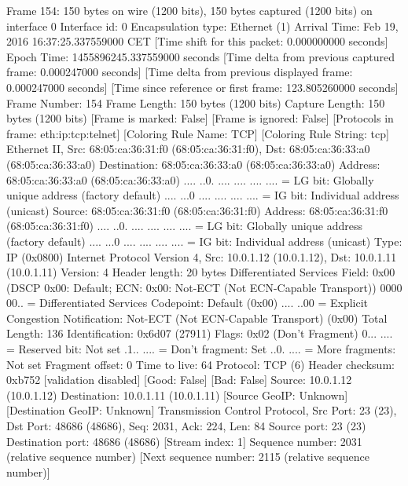 Frame 154: 150 bytes on wire (1200 bits), 150 bytes captured (1200 bits) on interface 0
    Interface id: 0
    Encapsulation type: Ethernet (1)
    Arrival Time: Feb 19, 2016 16:37:25.337559000 CET
    [Time shift for this packet: 0.000000000 seconds]
    Epoch Time: 1455896245.337559000 seconds
    [Time delta from previous captured frame: 0.000247000 seconds]
    [Time delta from previous displayed frame: 0.000247000 seconds]
    [Time since reference or first frame: 123.805260000 seconds]
    Frame Number: 154
    Frame Length: 150 bytes (1200 bits)
    Capture Length: 150 bytes (1200 bits)
    [Frame is marked: False]
    [Frame is ignored: False]
    [Protocols in frame: eth:ip:tcp:telnet]
    [Coloring Rule Name: TCP]
    [Coloring Rule String: tcp]
Ethernet II, Src: 68:05:ca:36:31:f0 (68:05:ca:36:31:f0), Dst: 68:05:ca:36:33:a0 (68:05:ca:36:33:a0)
    Destination: 68:05:ca:36:33:a0 (68:05:ca:36:33:a0)
        Address: 68:05:ca:36:33:a0 (68:05:ca:36:33:a0)
        .... ..0. .... .... .... .... = LG bit: Globally unique address (factory default)
        .... ...0 .... .... .... .... = IG bit: Individual address (unicast)
    Source: 68:05:ca:36:31:f0 (68:05:ca:36:31:f0)
        Address: 68:05:ca:36:31:f0 (68:05:ca:36:31:f0)
        .... ..0. .... .... .... .... = LG bit: Globally unique address (factory default)
        .... ...0 .... .... .... .... = IG bit: Individual address (unicast)
    Type: IP (0x0800)
Internet Protocol Version 4, Src: 10.0.1.12 (10.0.1.12), Dst: 10.0.1.11 (10.0.1.11)
    Version: 4
    Header length: 20 bytes
    Differentiated Services Field: 0x00 (DSCP 0x00: Default; ECN: 0x00: Not-ECT (Not ECN-Capable Transport))
        0000 00.. = Differentiated Services Codepoint: Default (0x00)
        .... ..00 = Explicit Congestion Notification: Not-ECT (Not ECN-Capable Transport) (0x00)
    Total Length: 136
    Identification: 0x6d07 (27911)
    Flags: 0x02 (Don't Fragment)
        0... .... = Reserved bit: Not set
        .1.. .... = Don't fragment: Set
        ..0. .... = More fragments: Not set
    Fragment offset: 0
    Time to live: 64
    Protocol: TCP (6)
    Header checksum: 0xb752 [validation disabled]
        [Good: False]
        [Bad: False]
    Source: 10.0.1.12 (10.0.1.12)
    Destination: 10.0.1.11 (10.0.1.11)
    [Source GeoIP: Unknown]
    [Destination GeoIP: Unknown]
Transmission Control Protocol, Src Port: 23 (23), Dst Port: 48686 (48686), Seq: 2031, Ack: 224, Len: 84
    Source port: 23 (23)
    Destination port: 48686 (48686)
    [Stream index: 1]
    Sequence number: 2031    (relative sequence number)
    [Next sequence number: 2115    (relative sequence number)]

